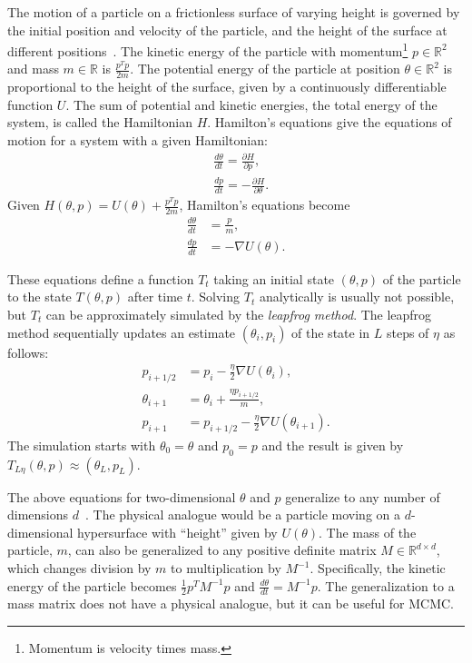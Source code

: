 \documentclass[english,twoside,openright]{HYgraduMLDS}
\newcommand{\R}{\mathbb{R}}
\begin{document}
The motion of a particle on a frictionless surface of varying height is governed 
by the initial position and velocity of the particle, and the height of the 
surface at different positions~\cite{neal2012mcmc}. 
The kinetic energy of the particle with 
momentum\footnote{Momentum is velocity times mass.}
\(p \in \R^{2}\) and mass \(m \in \R\) is \(\frac{p^{T}p}{2m}\). The potential energy of the particle
at position \(\theta \in \R^{2}\) is proportional to the height of the surface, given by
a continuously differentiable function \(U\).
The sum of potential and kinetic energies, the total 
energy of the system, is called the Hamiltonian \(H\). Hamilton's equations 
give the equations of motion for a system with a given Hamiltonian:
\begin{align*}
    &\frac{d\theta}{dt} = \frac{\partial H}{\partial p},\\
    &\frac{dp}{dt} = -\frac{\partial H}{\partial \theta}.
\end{align*}
Given \(H(\theta, p) = U(\theta) + \frac{p^{T}p}{2m}\), Hamilton's equations become
\begin{align*}
    \frac{d\theta}{dt} &= \frac{p}{m}, \\
    \frac{dp}{dt} &= -\nabla U(\theta).
\end{align*}

These equations define a function \(T_t\) taking an initial state 
\((\theta, p)\) of the particle to the state \(T(\theta, p)\) after time \(t\).
Solving \(T_t\) analytically is usually not possible, but \(T_t\) can be 
approximately simulated by the \emph{leapfrog method}. The leapfrog method sequentially
updates an estimate \((\theta_i, p_i)\) of the state in \(L\) steps of \(\eta\)
as follows:
\begin{align*}
    p_{i+1/2} &= p_i - \frac{\eta}{2}\nabla U(\theta_i), \\
    \theta_{i+1} &= \theta_i + \frac{\eta p_{i+1/2}}{m}, \\
    p_{i+1} &= p_{i+1/2} - \frac{\eta}{2}\nabla U(\theta_{i+1}).
\end{align*}
The simulation starts with \(\theta_0 = \theta\) and \(p_0 = p\) and the 
result is given by \(T_{L\eta}(\theta, p) \approx (\theta_L, p_L)\).

The above equations for two-dimensional \(\theta\) and \(p\) generalize to
any number of dimensions \(d\)~\cite{neal2012mcmc}. The physical analogue would be a particle moving
on a \(d\)-dimensional hypersurface with ``height'' given by \(U(\theta)\).
The mass of the particle, \(m\), can also be generalized to any positive
definite matrix \(M \in \R^{d\times d}\), which changes division by
\(m\) to multiplication by \(M^{-1}\). Specifically, the kinetic energy of the
particle becomes \(\frac{1}{2}p^{T}M^{-1}p\) and
\(\frac{d\theta}{dt} = M^{-1}p\). The generalization to a mass matrix does not
have a physical analogue, but it can be useful for MCMC.
\end{document}
